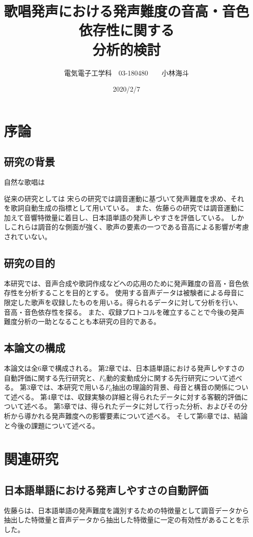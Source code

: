\documentclass[10.5ptj,a4j,dvipdfmx,uplatex, oneside, openany, report]{jsbook}%
\title{歌唱発声における発声難度の音高・音色依存性に関する\\分析的検討}
\author{電気電子工学科　03-180480　　小林海斗}
\date{2020/2/7}
\begin{document}
\maketitle

\tableofcontents

\chapter{序論}

\section{研究の背景}
自然な歌唱は

従来の研究としては
宋らの研究では調音運動に基づいて発声難度を求め、それを歌詞自動生成の指標として用いている\cite{so}。
また、佐藤らの研究では調音運動に加えて音響特徴量に着目し、日本語単語の発声しやすさを評価している\cite{sato}。
しかしこれらは調音的な側面が強く、歌声の要素の一つである音高による影響が考慮されていない。


\section{研究の目的}
本研究では、音声合成や歌詞作成などへの応用のために発声難度の音高・音色依存性を分析することを目的とする。
使用する音声データは被験者による母音に限定した歌声を収録したものを用いる。得られるデータに対して分析を行い、
音高・音色依存性を探る。
また、収録プロトコルを確立することで今後の発声難度分析の一助となることも本研究の目的である。

\section{本論文の構成}
本論文は全6章で構成される。
第2章では、日本語単語における発声しやすさの自動評価に関する先行研究と、$F_0$動的変動成分に関する先行研究について述べる。
第3章では、本研究で用いる$F_0$抽出の理論的背景、母音と構音の関係について述べる。
第4章では、収録実験の詳細と得られたデータに対する客観的評価について述べる。
第5章では、得られたデータに対して行った分析、およびその分析から導かれる発声難度への影響要素について述べる。
そして第6章では、結論と今後の課題について述べる。



\chapter{関連研究}


\section{日本語単語における発声しやすさの自動評価}
佐藤らは、日本語単語の発声難度を識別するための特徴量として調音データから抽出した特徴量と音声データから抽出した特徴量に一定の有効性があることを示した\cite{sato}。
\end{document}
